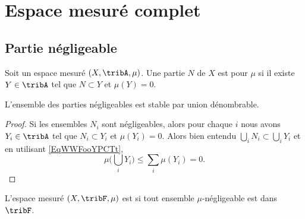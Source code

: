 \section{Espace mesuré complet}

\subsection{Partie négligeable}

\begin{definition}  \label{DefAVDoomkuXi}
	Soit un espace mesuré \( (X,\tribA,\mu)\). Une partie \( N\) de \( X\) est  pour \( \mu\) si il existe \( Y\in\tribA\) tel que \( N\subset Y\) et \( \mu(Y)=0\).
\end{definition}

\begin{lemma}   \label{LemVKNooOCOQw}
	L'ensemble des parties négligeables est stable par union dénombrable.
\end{lemma}

\begin{proof}
	Si les ensembles \( N_i\) sont négligeables, alors pour chaque \( i\) nous avons \( Y_i\in\tribA\) tel que \( N_i\subset Y_i\) et \( \mu(Y_i)=0\). Alors bien entendu \( \bigcup_iN_i\subset \bigcup_iY_i\) et en utilisant \eqref{EqWWFooYPCTt},
	\begin{equation}
		\mu\big( \bigcup_iY_i \big)\leq \sum_i\mu(Y_i)=0.
	\end{equation}
\end{proof}

\begin{definition}  \label{DefBWAoomQZcI}
	L'espace mesuré \( (X,\tribF,\mu)\) est  si tout ensemble \( \mu\)-négligeable est dans \( \tribF\).
\end{definition}

